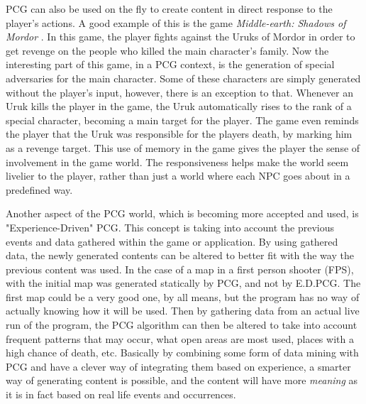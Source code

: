 PCG can also be used on the fly to create content in direct response to the player's actions. A good example of this is the game \textit{Middle-earth: Shadows of Mordor} \cite{game:shadowMordor}. In this game, the player fights against the Uruks of Mordor in order to get revenge on the people who killed the main character's family. 
Now the interesting part of this game, in a PCG context, is the generation of special adversaries for the main character. Some of these characters are simply generated without the player's input, however, there is an exception to that. Whenever an Uruk kills the player in the game, the Uruk automatically rises to the rank of a special character, becoming a main target for the player. The game even reminds the player that the Uruk was responsible for the players death, by marking him as a revenge target.
This use of memory in the game gives the player the sense of involvement in the game world. The responsiveness helps make the world seem livelier to the player, rather than just a world where each NPC goes about in a predefined way.

Another aspect of the PCG world, which is becoming more accepted and used, is "Experience-Driven" PCG\cite{art:edpcg}. This concept is taking into account the previous events and data gathered within the game or application. By using gathered data, the newly generated contents can be altered to better fit with the way the previous content was used. In the case of a map in a first person shooter (FPS), with the initial map was generated statically by PCG, and not by E.D.PCG. The first map could be a very good one, by all means, but the program has no way of actually knowing how it will be used. Then by gathering data from an actual live run of the program, the PCG algorithm can then be altered to take into account frequent patterns that may occur, what open areas are most used, places with a high chance of death, etc. Basically by combining some form of data mining with PCG and have a clever way of integrating them based on experience, a smarter way of generating content is possible, and the content will have more \textit{meaning} as it is in fact based on real life events and occurrences.

